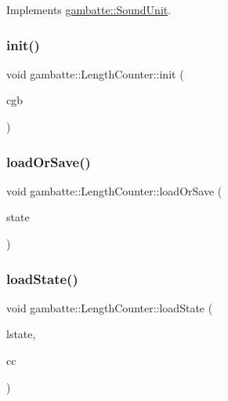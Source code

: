 Implements \hyperlink{classgambatte_1_1SoundUnit_a8ad6df87fc3700d9d3bee470383197b4}{gambatte\+::\+Sound\+Unit}.

\mbox{\label{classgambatte_1_1LengthCounter_aa04df35be4639e81df42171dce3d1934}} 
\subsubsection{\texorpdfstring{init()}{init()}}
{\footnotesize\ttfamily void gambatte\+::\+Length\+Counter\+::init (\begin{DoxyParamCaption}\item[{bool}]{cgb }\end{DoxyParamCaption})}

\mbox{\label{classgambatte_1_1LengthCounter_ad766b7f12bd30af4222cc9da435982b4}} 
\subsubsection{\texorpdfstring{load\+Or\+Save()}{loadOrSave()}}
{\footnotesize\ttfamily void gambatte\+::\+Length\+Counter\+::load\+Or\+Save (\begin{DoxyParamCaption}\item[{\hyperlink{classgambatte_1_1loadsave}{loadsave} \&}]{state }\end{DoxyParamCaption})}

\mbox{\label{classgambatte_1_1LengthCounter_ae49c50bda45d0d4056f31a3968294930}} 
\subsubsection{\texorpdfstring{load\+State()}{loadState()}}
{\footnotesize\ttfamily void gambatte\+::\+Length\+Counter\+::load\+State (\begin{DoxyParamCaption}\item[{\hyperlink{structgambatte_1_1SaveState_1_1SPU_1_1LCounter}{Save\+State\+::\+S\+P\+U\+::\+L\+Counter} const \&}]{lstate,  }\item[{unsigned}]{cc }\end{DoxyParamCaption})}

